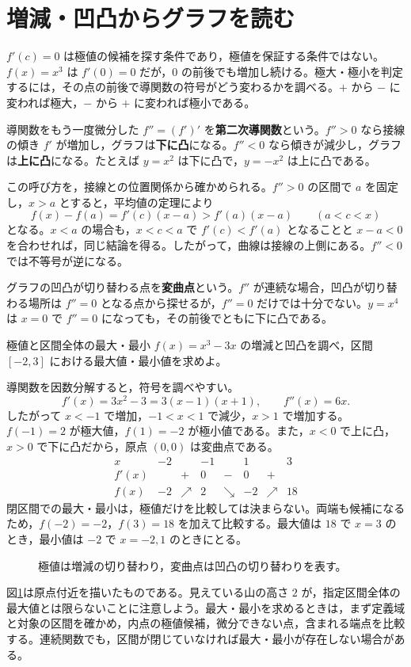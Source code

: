 \section{増減・凹凸からグラフを読む}\label{節:増減凹凸}
$f'(c)=0$ は極値の候補を探す条件であり，極値を保証する条件ではない。$f(x)=x^3$ は $f'(0)=0$ だが，$0$ の前後でも増加し続ける。極大・極小を判定するには，その点の前後で導関数の符号がどう変わるかを調べる。$+$ から $-$ に変われば極大，$-$ から $+$ に変われば極小である。

導関数をもう一度微分した $f''=(f')'$ を\textbf{第二次導関数}という。$f''>0$ なら接線の傾き $f'$ が増加し，グラフは\textbf{下に凸}になる。$f''<0$ なら傾きが減少し，グラフは\textbf{上に凸}になる。たとえば $y=x^2$ は下に凸で，$y=-x^2$ は上に凸である。

この呼び方を，接線との位置関係から確かめられる。$f''>0$ の区間で $a$ を固定し，$x>a$ とすると，平均値の定理により
\[
 f(x)-f(a)=f'(c)(x-a)>f'(a)(x-a)
 \qquad(a<c<x)
\]
となる。$x<a$ の場合も，$x<c<a$ で $f'(c)<f'(a)$ となることと $x-a<0$ を合わせれば，同じ結論を得る。したがって，曲線は接線の上側にある。$f''<0$ では不等号が逆になる。

グラフの凹凸が切り替わる点を\textbf{変曲点}という。$f''$ が連続な場合，凹凸が切り替わる場所は $f''=0$ となる点から探せるが，$f''=0$ だけでは十分でない。$y=x^4$ は $x=0$ で $f''=0$ になっても，その前後でともに下に凸である。

\begin{example}{極値と区間全体の最大・最小}
$f(x)=x^3-3x$ の増減と凹凸を調べ，区間 $[-2,3]$ における最大値・最小値を求めよ。
\end{example}
導関数を因数分解すると，符号を調べやすい。
\[
 f'(x)=3x^2-3=3(x-1)(x+1),\qquad f''(x)=6x.
\]
したがって $x<-1$ で増加，$-1<x<1$ で減少，$x>1$ で増加する。$f(-1)=2$ が極大値，$f(1)=-2$ が極小値である。また，$x<0$ で上に凸，$x>0$ で下に凸だから，原点 $(0,0)$ は変曲点である。
\[
\begin{array}{c|ccccccc}
 x&-2&&-1&&1&&3\\ \hline
 f'(x)&&+&0&-&0&+&\\
 f(x)&-2&\nearrow&2&\searrow&-2&\nearrow&18
\end{array}
\]
閉区間での最大・最小は，極値だけを比較しては決まらない。両端も候補になるため，$f(-2)=-2$，$f(3)=18$ を加えて比較する。最大値は $18$ で $x=3$ のとき，最小値は $-2$ で $x=-2,1$ のときにとる。

\begin{figure}[htbp]
\centering
{}
\caption{極値は増減の切り替わり，変曲点は凹凸の切り替わりを表す。}
\label{図:三次増減}
\end{figure}

図\ref{図:三次増減}は原点付近を描いたものである。見えている山の高さ $2$ が，指定区間全体の最大値とは限らないことに注意しよう。最大・最小を求めるときは，まず定義域と対象の区間を確かめ，内点の極値候補，微分できない点，含まれる端点を比較する。連続関数でも，区間が閉じていなければ最大・最小が存在しない場合がある。

